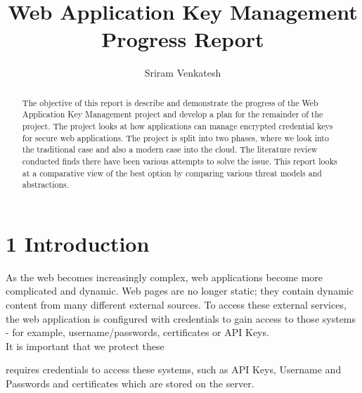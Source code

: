 \documentclass[11pt, a4paper, twoside, openright, notitlepage]{report}
\title{Web Application Key Management Progress Report}
\author{Sriram Venkatesh}
\date{}
\begin{document}
\frontmatter


\begin{abstract}
The objective of this report is describe and demonstrate the progress of the Web Application Key Management project and develop a plan for the remainder of the project. The project looks at how applications can manage encrypted credential keys for secure web applications. The project is split into two phases, where we look into the traditional case and also a modern case into the cloud. The literature review conducted finds there have been various attempts to solve the issue. This report looks at a comparative view of the best option by comparing various threat models and abstractions. 
\end{abstract}


\maketitle




\mainmatter


\section*{1 Introduction}
As the web becomes increasingly complex, web applications become more complicated and dynamic. Web pages are no longer static; they contain dynamic content from many different external sources. To access these external services, the web application is configured with credentials to gain access to those systems - for example, username/passwords, certificates or API Keys. \\

It is important that we protect these 


requires credentials to access these systems, such as API Keys, Username and Passwords and certificates which are stored on the server. \\
\end{document}
